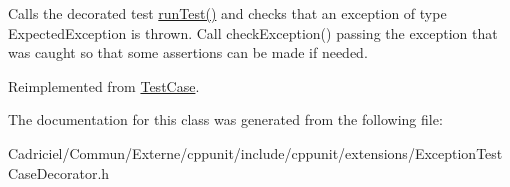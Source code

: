 Calls the decorated test \hyperlink{class_exception_test_case_decorator_a3f78294d459a94f55413162d814f291d}{run\+Test()} and checks that an exception of type Expected\+Exception is thrown. Call check\+Exception() passing the exception that was caught so that some assertions can be made if needed. 

Reimplemented from \hyperlink{class_test_case_a6b55957ac1dfef01e5d9fa2475676f34}{Test\+Case}.



The documentation for this class was generated from the following file\+:\begin{DoxyCompactItemize}
\item 
Cadriciel/\+Commun/\+Externe/cppunit/include/cppunit/extensions/Exception\+Test\+Case\+Decorator.\+h\end{DoxyCompactItemize}
